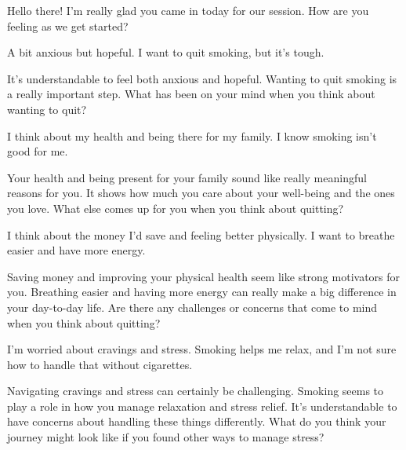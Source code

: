\begin{counsellorbox}
Hello there! I'm really glad you came in today for our session. How are you feeling as we get started?
\end{counsellorbox}

\begin{clientbox}
A bit anxious but hopeful. I want to quit smoking, but it's tough.
\end{clientbox}

\begin{counsellorbox}
It’s understandable to feel both anxious and hopeful. Wanting to quit smoking is a really important step. What has been on your mind when you think about wanting to quit?
\end{counsellorbox}

\begin{clientbox}
I think about my health and being there for my family. I know smoking isn't good for me.
\end{clientbox}

\begin{counsellorbox}
Your health and being present for your family sound like really meaningful reasons for you. It shows how much you care about your well-being and the ones you love. What else comes up for you when you think about quitting?
\end{counsellorbox}

\begin{clientbox}
I think about the money I'd save and feeling better physically. I want to breathe easier and have more energy.
\end{clientbox}

\begin{counsellorbox}
Saving money and improving your physical health seem like strong motivators for you. Breathing easier and having more energy can really make a big difference in your day-to-day life. Are there any challenges or concerns that come to mind when you think about quitting?
\end{counsellorbox}

\begin{clientbox}
I'm worried about cravings and stress. Smoking helps me relax, and I'm not sure how to handle that without cigarettes.
\end{clientbox}

\begin{counsellorbox}
Navigating cravings and stress can certainly be challenging. Smoking seems to play a role in how you manage relaxation and stress relief. It's understandable to have concerns about handling these things differently. What do you think your journey might look like if you found other ways to manage stress?
\end{counsellorbox}

